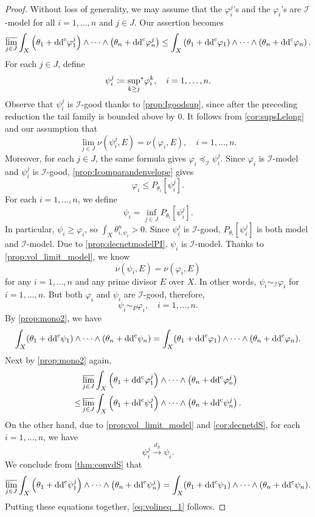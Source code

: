 \begin{proof}
    Without loss of generality, we may assume that the $\varphi_i^j$'s and the $\varphi_i$'s are $\mathcal{I}$-model for all $i=1,\ldots,n$ and $j\in J$. Our assertion becomes
    \begin{equation}\label{eq:volineq_1}
    \varlimsup_{j\in J} \int_X \left(\theta_1+\ddc \varphi_1^j\right)\wedge \dots \wedge \left(\theta_n+\ddc \varphi_n^j \right) \leq  \int_X \left(\theta_1+\ddc \varphi_1\right) \wedge \dots \wedge \left(\theta_n+\ddc \varphi_n\right).
    \end{equation}
    For each $j\in J$, define
    \[
    \psi_i^j\coloneqq \uscsup[k\geq j] \varphi_i^k,\quad i=1,\ldots,n.
    \]
    Observe that $\psi_i^j$ is $\mathcal{I}$-good thanks to \cref{prop:Igoodsup}, since after the preceding reduction the tail family is bounded above by $0$.
    It follows from \cref{cor:supsLelong} and our assumption that
    \[
    \lim_{j\in J}\nu\left(\psi_i^j,E\right)=\nu\left(\varphi_i,E\right),\quad i=1,\ldots,n.
    \]
    Moreover, for each $j\in J$, the same formula gives $\varphi_i\preceq_{\mathcal{I}}\psi_i^j$. Since $\varphi_i$ is $\mathcal{I}$-model and $\psi_i^j$ is $\mathcal{I}$-good, \cref{prop:Icomparandenvelope} gives
    \[
        \varphi_i\leq P_{\theta_i}\left[\psi_i^j\right].
    \]
    For each $i=1,\ldots,n$, we define
    \[
    \psi_i=\inf_{j\in J}P_{\theta_i}\left[\psi_i^j\right].
    \]
    In particular, $\psi_i\geq\varphi_i$, so $\int_X\theta_{i,\psi_i}^n>0$.
    Since $\psi_i^j$ is $\mathcal{I}$-good, $P_{\theta_i}[\psi_i^j]$ is both model and $\mathcal{I}$-model. Due to \cref{prop:decnetmodelPI}, $\psi_i$ is $\mathcal{I}$-model.
    Thanks to \cref{prop:vol_limit_model}, we know
    \[
    \nu(\psi_i,E)=\nu(\varphi_i,E)
    \]
    for any $i=1,\ldots,n$ and any prime divisor $E$ over $X$. In other words, $\psi_i\sim_{\mathcal{I}} \varphi_i$ for $i=1,\ldots,n$. But both $\varphi_i$ and $\psi_i$ are $\mathcal{I}$-good, therefore,
    \[
    \psi_i\sim_{P} \varphi_i,\quad i=1,\ldots,n.
    \]
    By \cref{prop:mono2}, we have
    \[
    \int_X (\theta_1+\ddc \psi_1)\wedge \cdots\wedge (\theta_n+\ddc \psi_n)=\int_X (\theta_1+\ddc \varphi_1)\wedge \cdots\wedge (\theta_n+\ddc \varphi_n).
    \]
    Next by \cref{prop:mono2} again,
    \[
    \begin{split}
    &\varlimsup_{j\in J} \int_X \left(\theta_1+\ddc \varphi_1^j\right)\wedge\dots\wedge  \left(\theta_n+\ddc \varphi_n^j \right)\\
    \leq & \varlimsup_{j\in J} \int_X \left(\theta_1+\ddc \psi_1^j\right)\wedge \dots \wedge \left(\theta_n+\ddc \psi_n^j \right).
    \end{split}
    \]
    On the other hand, due to \cref{prop:vol_limit_model} and \cref{cor:decnetdS}, for each $i=1,\ldots,n$, we have
    \[
    \psi_i^j\xrightarrow{d_S}\psi_i.
    \]
    We conclude from \cref{thm:convdS} that
    \[
    \varlimsup_{j\in J} \int_X \left(\theta_1+\ddc \psi_1^j\right)\wedge \dots \wedge \left(\theta_n+\ddc \psi_n^j \right)=\int_X (\theta_1+\ddc \psi_1)\wedge \cdots\wedge (\theta_n+\ddc \psi_n).
    \]
    Putting these equations together, \eqref{eq:volineq_1} follows.


\end{proof}

